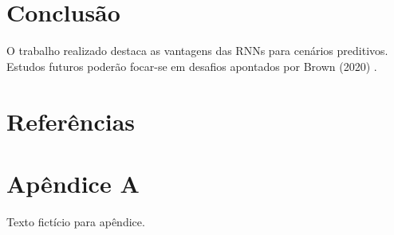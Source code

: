 \documentclass[a4paper,12pt]{report}
\begin{document}
	\chapter{Conclusão}
	O trabalho realizado destaca as vantagens das RNNs para cenários preditivos. Estudos futuros poderão focar-se em desafios apontados por Brown (2020) \citep{brown2020}.
	
	\chapter*{Referências}
	
	
	
	\appendix
	\chapter{Apêndice A}
	Texto fictício para apêndice. 
	\lipsum[10]
	
\end{document}
